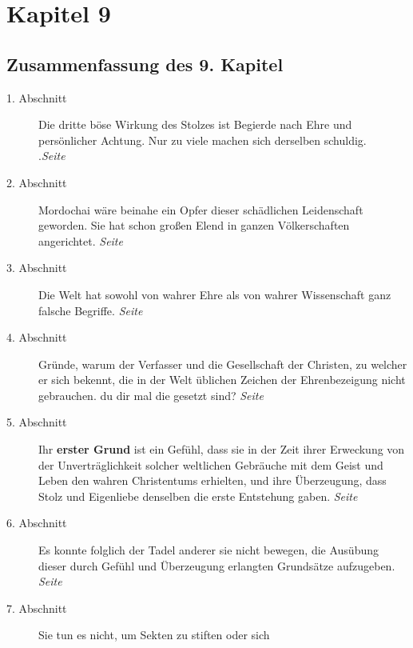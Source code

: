 
\chapter{Kapitel 9} \label{kap9}


\section{Zusammenfassung des 9. Kapitel}

\begin{description}
\item[1. Abschnitt] Die dritte böse Wirkung des Stolzes ist Begierde nach Ehre
und persönlicher Achtung. Nur zu viele machen sich derselben schuldig.\\
.\dotfill \textit{Seite~\pageref{kap9_ab1}}\\
\item[2. Abschnitt] Mordochai wäre beinahe ein Opfer dieser schädlichen
Leidenschaft geworden. Sie hat schon großen Elend in ganzen Völkerschaften
angerichtet.
\dotfill \textit{Seite~\pageref{kap9_ab2}}\\
\item[3. Abschnitt] Die Welt hat sowohl von wahrer Ehre als von wahrer
Wissenschaft ganz falsche Begriffe.
\dotfill \textit{Seite~\pageref{kap9_ab3}}\\
\item[4. Abschnitt] Gründe, warum der Verfasser und die Gesellschaft der
Christen, zu welcher er sich bekennt, die in der Welt üblichen Zeichen der
Ehrenbezeigung nicht gebrauchen.
du dir mal die
gesetzt sind?
\dotfill \textit{Seite~\pageref{kap9_ab4}}\\
\item[5. Abschnitt] Ihr \textbf{erster Grund} ist ein Gefühl, dass sie in der
Zeit ihrer
Erweckung von der Unverträglichkeit solcher weltlichen Gebräuche mit dem Geist
und Leben den wahren Christentums erhielten, und ihre Überzeugung, dass Stolz
und Eigenliebe denselben die erste Entstehung gaben.
\dotfill \textit{Seite~\pageref{kap9_ab5}}\\
\item[6. Abschnitt] Es konnte folglich der Tadel anderer sie nicht bewegen, die
Ausübung dieser durch Gefühl und Überzeugung erlangten Grundsätze aufzugeben.
\dotfill \textit{Seite~\pageref{kap9_ab6}}\\
\item[7. Abschnitt] Sie tun es nicht, um Sekten zu stiften oder sich

\end{description}
